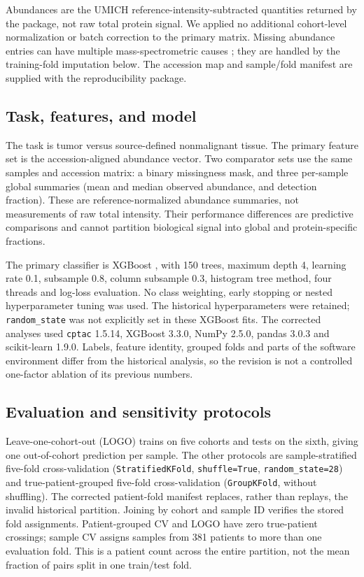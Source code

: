 Abundances are the UMICH reference-intensity-subtracted quantities returned
by the package, not raw total protein signal. We applied no additional
cohort-level normalization or batch correction to the primary matrix.
Missing abundance entries can have multiple mass-spectrometric causes
\citep{LazarMissing}; they are handled by the training-fold imputation below.
The accession map and sample/fold manifest are supplied with the
reproducibility package.

\subsection{Task, features, and model}

The task is tumor versus source-defined nonmalignant tissue. The primary
feature set is the accession-aligned abundance vector. Two comparator
sets use the same samples and accession matrix: a binary missingness mask,
and three per-sample global summaries (mean and median observed abundance,
and detection fraction). These are reference-normalized abundance
summaries, not measurements of raw total intensity. Their performance
differences are predictive comparisons and cannot partition biological
signal into global and protein-specific fractions.

The primary classifier is XGBoost \citep{XGBoost}, with 150 trees,
maximum depth 4, learning rate 0.1, subsample 0.8, column subsample 0.3,
histogram tree method, four threads and log-loss evaluation. No class
weighting, early stopping or nested hyperparameter tuning was used.
The historical hyperparameters were retained; \texttt{random\_state} was
not explicitly set in these XGBoost fits. The corrected analyses used
\texttt{cptac} 1.5.14, XGBoost 3.3.0, NumPy 2.5.0, pandas 3.0.3 and
scikit-learn 1.9.0. Labels, feature identity, grouped folds and parts of
the software environment differ from the historical analysis, so the
revision is not a controlled one-factor ablation of its previous numbers.

\subsection{Evaluation and sensitivity protocols}

Leave-one-cohort-out (LOGO) trains on five cohorts and tests on the sixth,
giving one out-of-cohort prediction per sample. The other protocols are
sample-stratified five-fold cross-validation (\texttt{StratifiedKFold},
\texttt{shuffle=True}, \texttt{random\_state=28}) and true-patient-grouped
five-fold cross-validation (\texttt{GroupKFold}, without shuffling).
The corrected patient-fold manifest replaces, rather than replays, the
invalid historical partition. Joining by cohort and sample ID verifies
the stored fold assignments. Patient-grouped CV and LOGO have zero
true-patient crossings; sample CV assigns samples from 381 patients to
more than one evaluation fold. This is a patient count across the entire
partition, not the mean fraction of pairs split in one train/test fold.

